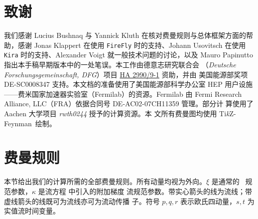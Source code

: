 \section*{致谢}

我们感谢 Lucius Bushnaq 与 Yannick Kluth 在核对费曼规则与总体框架方面的帮
助，感谢 Jonas Klappert 在使用 \texttt{FireFly} 时的支持、Johann Usovitsch
在使用 \texttt{Kira} 时的支持、Alexander Voigt 就一般技术问题的讨论，以及
Mauro Papinutto 指出本手稿早期版本中的一处笔误。本工作由德意志研究联合会
（\textit{Deutsche Forschungsgemeinschaft, DFG}）项目
\href{http://gepris.dfg.de/gepris/projekt/386986591}{HA 2990/9-1} 资助，并由
美国能源部奖项 DE-SC0008347 支持。本文档的准备使用了美国能源部科学办公室
HEP 用户设施——费米国家加速器实验室（Fermilab）的资源。Fermilab 由
Fermi Research Alliance, LLC（FRA）依据合同号 DE-AC02-07CH11359 管理。部分计
算使用了  Aachen 大学项目 \textit{rwth0244} 授予的计算资源。本
文所有费曼图均使用 Ti\textit{k}Z-Feynman\,\cite{Ellis:2016jkw} 绘制。



\appendix

\section{费曼规则}
\label{sec:frules}

本节给出我们的计算所需的全部费曼规则。所有动量均视为外向。$\xi$
是通常的 \qcd\ 规范参数，$\kappa$ 是流方程  中引入的附加梯度
流规范参数。带实心箭头的线为流线；带虚线箭头的线既可为流线亦可为流动传播
子。符号 $p,q,r$ 表示欧氏四动量，$s,t$ 为实值流时间变量。

